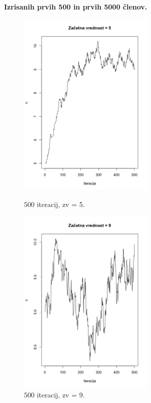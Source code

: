 \documentclass[a4paper,11pt]{article}
\begin{document}
    \noindent
\textbf{Izrisanih prvih 500 in prvih 5000 členov.}
    \begin{figure}[ht!]
        \begin{minipage}{0.5\textwidth}
            \centering
            \includegraphics[width = 65mm]{Slike/2_2_500_zv5.png}
            \caption{$500$ iteracij, zv = 5.}
        \end{minipage}
        \begin{minipage}{0.5\textwidth}
            \centering
            \includegraphics[width = 65mm]{Slike/2_2_500_zv9.png}
            \caption{$500$ iteracij, zv = 9.}
        \end{minipage}
    \end{figure}
\end{document}
